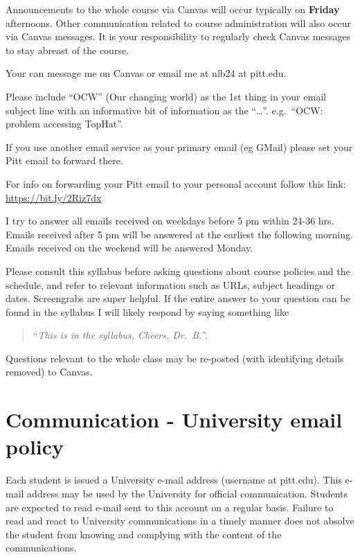 \documentclass[
]{book}
\begin{document}
Announcements to the whole course via Canvas will occur typically on \textbf{Friday} afternoons. Other communication related to course administration will also occur via Canvas messages. It is your responsibility to regularly check Canvas messages to stay abreast of the course.

Your can message me on Canvas or email me at nlb24 at pitt.edu.

Please include ``OCW'' (Our changing world) as the 1st thing in your email subject line with an informative bit of information as the ``\ldots{}''. e.g.~``OCW: problem accessing TopHat''.

If you use another email service as your primary email (eg GMail) please set your Pitt email to forward there.

For info on forwarding your Pitt email to your personal account follow this link: \url{https://bit.ly/2Riz7dx}

I try to answer all emails received on weekdays before 5 pm within 24-36 hrs. Emails received after 5 pm will be answered at the earliest the following morning. Emails received on the weekend will be answered Monday.

Please consult this syllabus before asking questions about course policies and the schedule, and refer to relevant information such as URLs, subject headings or dates. Screengrabs are super helpful. If the entire answer to your question can be found in the syllabus I will likely respond by saying something like

\begin{quote}
``\emph{This is in the syllabus, Cheers, Dr.~B.}''.
\end{quote}

Questions relevant to the whole class may be re-posted (with identifying details removed) to Canvas.

\hypertarget{communication---university-email-policy}{%
\chapter{Communication - University email policy}\label{communication---university-email-policy}}

Each student is issued a University e-mail address (username at pitt.edu). This e-mail address may be used by the University for official communication. Students are expected to read e-mail sent to this account on a regular basis. Failure to read and react to University communications in a timely manner does not absolve the student from knowing and complying with the content of the communications.
\end{document}
